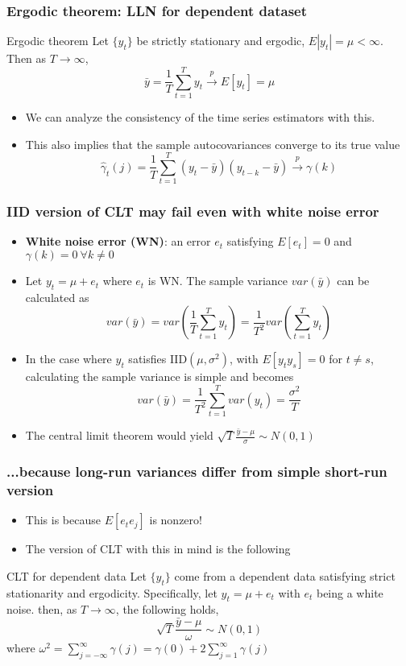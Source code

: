 \documentclass[aspectratio=169]{beamer}
\begin{document}
\begin{frame}
\frametitle{Ergodic theorem: LLN for dependent dataset}
\begin{block}{Ergodic theorem}
Let $\{y_t\}$ be strictly stationary and ergodic, $E|y_t|=\mu<\infty$. Then as $T\to \infty$, 
\[
\bar{y} = \frac{1}{T}\sum_{t=1}^T y_t  \xrightarrow{p} E[y_t]=\mu
\]
\end{block}
\begin{itemize}
\item We can analyze the consistency of the time series estimators with this.
\item This also implies that the sample autocovariances converge to its true value
\[
\widehat{\gamma}_t(j)=\frac{1}{T}\sum_{t=1}^T (y_t-\bar{y})(y_{t-k}-\bar{y})\xrightarrow{p} \gamma(k)
\]
\end{itemize}
\end{frame}

\begin{frame}
\frametitle{IID version of CLT may fail even with white noise error}
\begin{itemize}
\item \textbf{White noise error (WN)}: an error $e_t$ satisfying $E[e_t]=0$ and $\gamma(k)=0 \ \forall k\neq0$
\item Let $y_t=\mu+e_t$ where $e_t$ is WN. The sample variance $var(\bar{y})$ can be calculated as
\[
var(\bar{y})=var\left(\frac{1}{T}\sum_{t=1}^T y_t\right)
=\frac{1}{T^2}var\left(\sum_{t=1}^T y_t\right)
\]
\item In the case where $y_t$ satisfies IID$(\mu, \sigma^2)$, with $E[y_ty_s]=0$ for $t\neq s$, calculating the sample variance is simple and becomes 
\[
var(\bar{y})=\frac{1}{T^2}\sum_{t=1}^Tvar(y_t)=\frac{\sigma^2}{T}
\]
\item The central limit theorem would yield $\sqrt{T}\frac{\bar{y}-\mu}{\sigma}\sim N(0,1)$
\end{itemize}
\end{frame}


\begin{frame}
\frametitle{...because long-run variances differ from simple short-run version}
\begin{itemize}
\item This is because $E[e_te_j]$ is nonzero!
\item The version of CLT with this in mind is the following
\end{itemize}
\begin{block}{CLT for dependent data}
Let $\{y_t\}$ come from a dependent data satisfying strict stationarity and ergodicity. Specifically, let $y_t = \mu + e_t$ with $e_t$ being a white noise. then, as $T\to\infty$, the following holds, 
\[
\sqrt{T}\frac{\bar{y}-\mu}{\omega}\sim N(0,1)
\]
where $\omega^2= \sum_{j=-\infty}^\infty \gamma(j)=\gamma(0)+2\sum_{j=1}^\infty \gamma(j)$
\end{block}
\end{frame}
\end{document}
